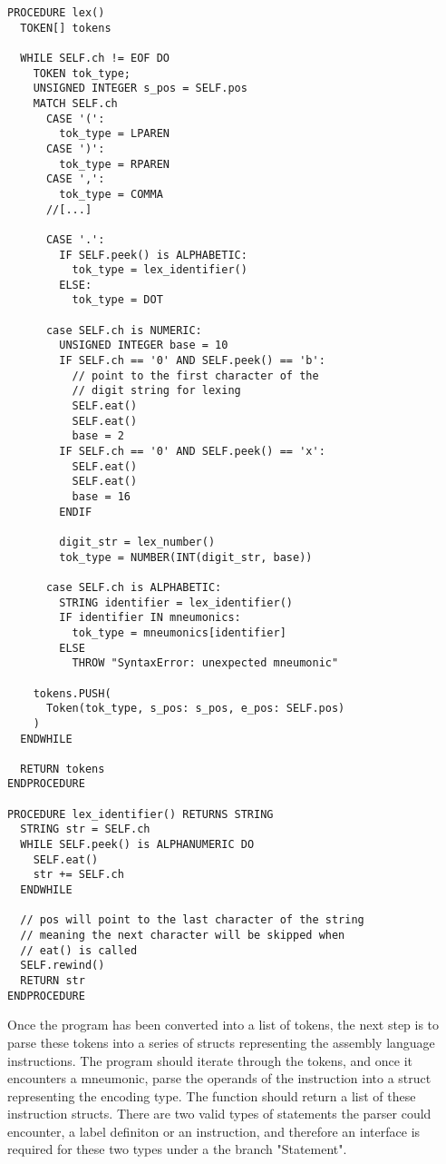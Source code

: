 \begin{lstlisting}
PROCEDURE lex() 
  TOKEN[] tokens

  WHILE SELF.ch != EOF DO 
    TOKEN tok_type;
    UNSIGNED INTEGER s_pos = SELF.pos
    MATCH SELF.ch 
      CASE '(':
        tok_type = LPAREN
      CASE ')':
        tok_type = RPAREN
      CASE ',':
        tok_type = COMMA
      //[...]

      CASE '.':
        IF SELF.peek() is ALPHABETIC:
          tok_type = lex_identifier()
        ELSE:
          tok_type = DOT

      case SELF.ch is NUMERIC:
        UNSIGNED INTEGER base = 10
        IF SELF.ch == '0' AND SELF.peek() == 'b':
          // point to the first character of the
          // digit string for lexing
          SELF.eat()
          SELF.eat()
          base = 2
        IF SELF.ch == '0' AND SELF.peek() == 'x':
          SELF.eat()
          SELF.eat()
          base = 16
        ENDIF
        
        digit_str = lex_number()
        tok_type = NUMBER(INT(digit_str, base)) 

      case SELF.ch is ALPHABETIC:
        STRING identifier = lex_identifier()
        IF identifier IN mneumonics:
          tok_type = mneumonics[identifier]
        ELSE 
          THROW "SyntaxError: unexpected mneumonic"

    tokens.PUSH(
      Token(tok_type, s_pos: s_pos, e_pos: SELF.pos)
    )
  ENDWHILE

  RETURN tokens
ENDPROCEDURE

PROCEDURE lex_identifier() RETURNS STRING
  STRING str = SELF.ch
  WHILE SELF.peek() is ALPHANUMERIC DO 
    SELF.eat()
    str += SELF.ch
  ENDWHILE 

  // pos will point to the last character of the string 
  // meaning the next character will be skipped when 
  // eat() is called 
  SELF.rewind()
  RETURN str
ENDPROCEDURE
\end{lstlisting}

Once the program has been converted into a list of tokens, the next step is to parse these tokens into a series of structs representing the assembly language instructions. The program should iterate through the tokens, and once it encounters a mneumonic, parse the operands of the instruction into a struct representing the encoding type. The function should return a list of these instruction structs. There are two valid types of statements the parser could encounter, a label definiton or an instruction, and therefore an interface is required for these two types under a the branch "Statement".

